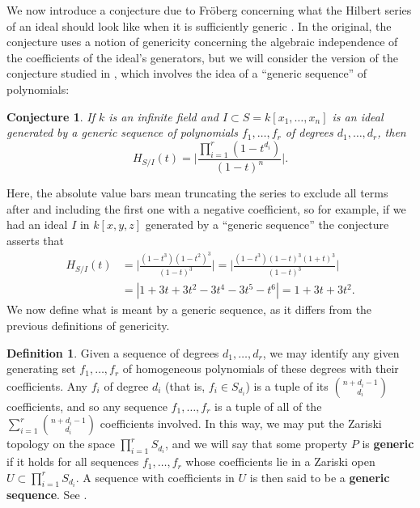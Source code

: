 \documentclass[11pt]{article}
\newtheorem{conjecture}{Conjecture}
\theoremstyle{definition}
\newtheorem{definition}{Definition}
\begin{document}
We now introduce a conjecture due to Fröberg concerning what the Hilbert series of an ideal should look like when it is sufficiently generic \cite{froberg1985inequality}. In the original, the conjecture uses a notion of genericity concerning the algebraic independence of the coefficients of the ideal's generators, but we will consider the version of the conjecture studied in \cite{pardue2010generic}, which involves the idea of a ``generic sequence'' of polynomials: 


\begin{conjecture}\label{Fr}
	If $k$ is an infinite field and $I \subset S = k[x_1, \dots, x_n]$ is an ideal generated by a generic sequence of polynomials $f_1, \dots, f_r$ of degrees $d_1, \dots, d_r$, then \[ H_{S/I}(t) = \bigg| \frac{\prod_{i=1}^r (1 - t^{d_i})}{(1 - t)^n} \bigg|. \] 
\end{conjecture}


Here, the absolute value bars mean truncating the series to exclude all terms after and including the first one with a negative coefficient, so for example, if we had an ideal $I$ in $k[x,y,z]$ generated by a ``generic sequence'' the conjecture asserts that \begin{align*}
	H_{S/I}(t) &= \bigg| \frac{(1 - t^3)(1 - t^2)^3}{(1 - t)^3} \bigg| = \bigg| \frac{(1 - t^3)(1 - t)^3(1 + t)^3}{(1 - t)^3} \bigg| \\
	&= |1 + 3t + 3t^2 - 3t^4 - 3t^5 - t^6| = 1 + 3t + 3t^2.
\end{align*} We now define what is meant by a generic sequence, as it differs from the previous definitions of genericity. 


\begin{definition}\label{def:genD}
	Given a sequence of degrees $d_1, \dots, d_r$, we may identify any given generating set $f_1, \dots, f_r$ of homogeneous polynomials of these degrees with their coefficients. Any $f_i$ of degree $d_i$ (that is, $f_i \in S_{d_i}$) is a tuple of its $\binom{n + d_i - 1}{d_i}$ coefficients, and so any sequence $f_1, \dots, f_r$ is a tuple of all of the $\sum_{i = 1}^r \binom{n + d_i - 1}{d_i}$ coefficients involved. In this way, we may put the Zariski topology on the space $\prod_{i = 1}^r S_{d_i}$, and we will say that some property $P$ is \textbf{generic} if it holds for all sequences $f_1, \dots, f_r$ whose coefficients lie in a Zariski open $U \subset \prod_{i = 1}^r S_{d_i}$. A sequence with coefficients in $U$ is then said to be a \textbf{generic sequence}. See \cite{pardue2010generic}.
\end{definition}
\end{document}
